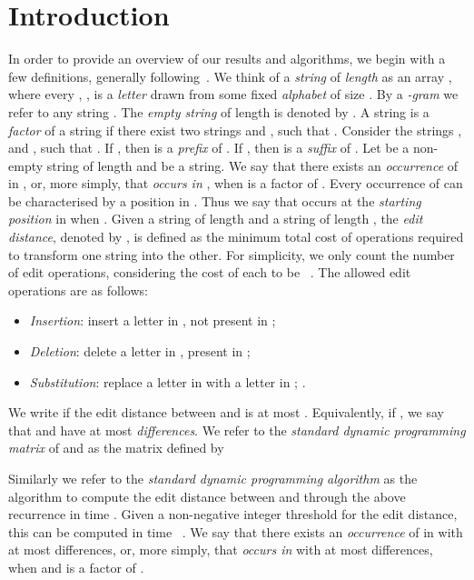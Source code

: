 \documentclass[runningheads, envcountsame, a4paper]{llncs}\usepackage{etex}
\begin{document}
\section{Introduction}
In order to provide an overview of our results and algorithms,
we begin with a few definitions, generally following~\cite{CHL07}.
We think of a \textit{string}  of \textit{length}  as an array
, where every , , is a \textit{letter}
drawn from some fixed \textit{alphabet}  of size .
By a {\em -gram} we refer to any string .
The \textit{empty string} of length  is denoted by .
A string  is a \textit{factor} of a string  if there exist two strings  and , such that .
Consider the strings , and , such that . If , 
then  is a \textit{prefix} of . If , then  is a \textit{suffix} of .
Let  be a non-empty string of length  and  be a string. 
We say that there exists an \textit{occurrence} of  in , or, more simply, that 
\textit{occurs in} , when  is a factor of .
Every occurrence of  can be characterised by a position in . Thus we say that  occurs at the
\textit{starting position}  in  when .
Given a string  of length  and a string  of length , the \emph{edit distance}, 
denoted by , is defined as the minimum total cost of operations 
required to transform one string into the other. For simplicity, we only count the number of edit operations, 
considering the cost of each to be ~\cite{levelshtein-66-binary}.
The allowed edit operations are as follows:
\begin{itemize}
	\item \emph{Insertion}: insert a letter in , not present in ; 
	\item \emph{Deletion}: delete a letter in , present in ;  
	\item \emph{Substitution}: replace a letter in  with a letter in ; . 
\end{itemize}

\noindent We write  if the edit distance between 
and  is at most . Equivalently, if , we say that
 and  have at most  {\em differences}. 
We refer to the \textit{standard dynamic programming matrix} of  and  as the matrix defined by

\noindent


\noindent Similarly we refer to the \textit{standard dynamic programming algorithm} as the algorithm to compute the 
edit distance between  and  through the above recurrence in time . 
Given a non-negative integer threshold  for the edit distance, this can be computed in time ~\cite{editd}.
We say that there exists an \textit{occurrence} of  in  with at most  differences, or, more simply, that 
\textit{occurs in}  with at most  differences, when  and  is a factor of .
\end{document}
